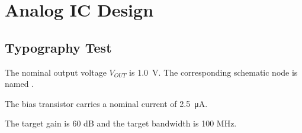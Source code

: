 \section{Analog IC Design}

\subsection{Typography Test}

The nominal output voltage $V_{OUT}$ is \qty{1.0}{\volt}.
The corresponding schematic node is named .

The bias transistor  carries a nominal current of
\qty{2.5}{\micro\ampere}.


The target gain is 60 dB and the target bandwidth is 100 MHz.

